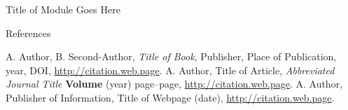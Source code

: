 \documentclass[oneside,10pt]{book}
\begin{document}
\begin{chapter}{Title of Module Goes Here}
\begin{section}{References}
\label{module-tag-references}
\begin{thebibliography}{3}
		A. Author, B. Second-Author, \textit{Title of Book}, Publisher, Place of Publication, year, DOI, \url{http://citation.web.page}. 
		A. Author, Title of Article, \textit{Abbreviated Journal Title} \textbf{Volume} (year) page--page, \url{http://citation.web.page}.
		A. Author, Publisher of Information, Title of Webpage (date), \url{http://citation.web.page}.
\end{thebibliography}
\end{section}
\end{chapter}
\end{document}
